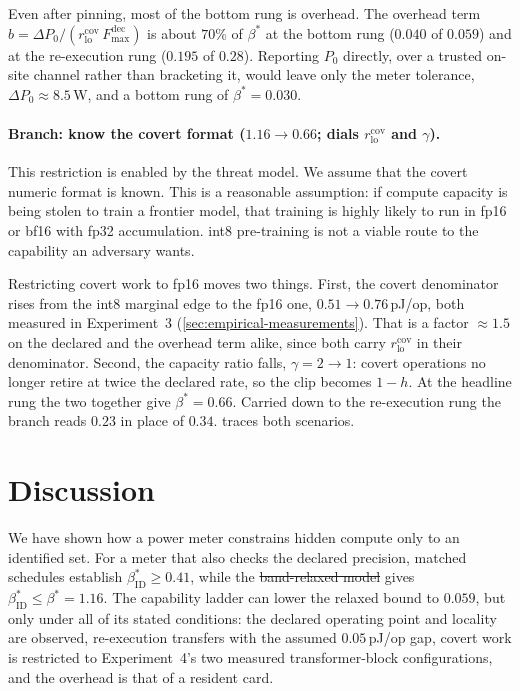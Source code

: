\documentclass{article}
\makeatletter
\theoremstyle{plain}
\theoremstyle{definition}
\theoremstyle{remark}
\providecommand{\DIFaddtex}[1]{{\protect\color{blue}\uwave{#1}}} %
\providecommand{\DIFdeltex}[1]{{\protect\color{red}\sout{#1}}} %
\providecommand{\DIFaddbegin}{} %
\providecommand{\DIFaddend}{} %
\providecommand{\DIFdelbegin}{} %
\providecommand{\DIFdelend}{} %
\providecommand{\DIFadd}[1]{\texorpdfstring{\DIFaddtex{#1}}{#1}} %
\providecommand{\DIFdel}[1]{\texorpdfstring{\DIFdeltex{#1}}{}} %
\providecommand{\DIFscaledelfig}{0.5}
\newlength{\DIFdelgraphicswidth} %
\newlength{\DIFdelgraphicsheight} %
\providecommand{\DIFaddincludegraphics}[2][]{{\color{blue}\fbox{\DIFOincludegraphics[#1]{#2}}}} %
\providecommand{\DIFdelincludegraphics}[2][]{%
\sbox{\DIFdelgraphicsbox}{\DIFOincludegraphics[#1]{#2}}%
\settoboxwidth{\DIFdelgraphicswidth}{\DIFdelgraphicsbox} %
\settoboxtotalheight{\DIFdelgraphicsheight}{\DIFdelgraphicsbox} %
\scalebox{\DIFscaledelfig}{%
\parbox[b]{\DIFdelgraphicswidth}{\usebox{\DIFdelgraphicsbox}\\[-\baselineskip] \rule{\DIFdelgraphicswidth}{0em}}\llap{\resizebox{\DIFdelgraphicswidth}{\DIFdelgraphicsheight}{%
\setlength{\unitlength}{\DIFdelgraphicswidth}%
\begin{picture}(1,1)%
\thicklines\linethickness{2pt} %
{\color[rgb]{1,0,0}\put(0,0){\framebox(1,1){}}}%
{\color[rgb]{1,0,0}\put(0,0){\line( 1,1){1}}}%
{\color[rgb]{1,0,0}\put(0,1){\line(1,-1){1}}}%
\end{picture}%
}\hspace*{3pt}}} %
} %
\DeclareRobustCommand{\DIFaddbegin}{\DIFOaddbegin \let\includegraphics\DIFaddincludegraphics} %
\DeclareRobustCommand{\DIFaddend}{\DIFOaddend \let\includegraphics\DIFOincludegraphics} %
\DeclareRobustCommand{\DIFdelbegin}{\DIFOdelbegin \let\includegraphics\DIFdelincludegraphics} %
\DeclareRobustCommand{\DIFdelend}{\DIFOaddend \let\includegraphics\DIFOincludegraphics} %
\let\sout@orig\sout %
\renewcommand{\sout}[1]{\ifmmode\text{\sout@orig{\ensuremath{#1}}}\else\sout@orig{#1}\fi} %
\makeatother
\begin{document}
Even after pinning, most of the bottom rung is overhead. The overhead term
$b = \Delta P_0/(r_{\mathrm{lo}}^{\mathrm{cov}}\,F_{\max}^{\mathrm{dec}})$ is
about $70\%$ of $\beta^{*}$ at the bottom rung ($0.040$ of $0.059$) and at the
re-execution rung ($0.195$ of $0.28$). Reporting $P_0$ directly, over a trusted
on-site channel rather than bracketing it, would leave only the meter tolerance,
$\Delta P_0 \approx 8.5$\,W, and a bottom rung of $\beta^{*}=0.030$.

\paragraph{Branch: know the covert format ($1.16 \to 0.66$; dials $r_{\mathrm{lo}}^{\mathrm{cov}}$ and $\gamma$).}

This restriction is enabled by the threat model. We assume that the covert numeric format
is known. This is a reasonable assumption:  if compute capacity is being stolen to train a frontier model, that training is highly likely to run in fp16 or bf16 with fp32 accumulation. int8 pre-training is not a viable route to the capability
an adversary wants.

Restricting covert work to fp16 moves two things. First, the covert
denominator rises from the int8 marginal edge to the fp16 one,
$0.51 \to 0.76$\,pJ/op, both measured in Experiment~3
(\cref{sec:empirical-measurements}). That is a factor ${\approx}1.5$ on the declared and
the overhead term alike, since both carry $r_{\mathrm{lo}}^{\mathrm{cov}}$ in
their denominator. Second, the capacity ratio falls, $\gamma = 2 \to 1$: covert
operations no longer retire at twice the declared rate, so the clip becomes
$1-h$. At the headline rung the two together give $\beta^{*} = 0.66$. Carried down to the re-execution rung the branch reads $0.23$ in
place of $0.34$.  traces both scenarios.


\section{Discussion}
\label{sec:discussion}
We have shown how a power meter constrains hidden compute only to an identified
set. For a meter that also checks the declared precision, matched schedules
establish $\beta_{\mathrm{ID}}^{*} \geq 0.41$, while the \DIFdelbegin \DIFdel{band-relaxed model
}\DIFdelend \DIFaddbegin \DIFadd{relaxed bound
}\DIFaddend gives $\beta_{\mathrm{ID}}^{*} \leq \beta^{*} = 1.16$. The capability ladder
can lower the relaxed bound to $0.059$, but only under all of its stated
conditions: the declared operating point and locality are observed,
re-execution transfers with the assumed $0.05$\,pJ/op gap, covert work is
restricted to Experiment~4's two measured transformer-block configurations,
and the overhead is that of a resident card.
\end{document}
